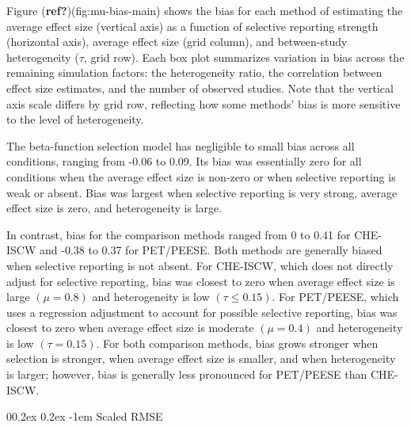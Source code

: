 \documentclass[
  american,
  man, donotrepeattitle,floatsintext]{apa7}
\makeatletter
\let\oldparagraph\paragraph
\renewcommand{\paragraph}{
    \@ifstar
      \xxxParagraphStar
      \xxxParagraphNoStar
  }
\newcommand{\xxxParagraphStar}[1]{\oldparagraph*{#1}\mbox{}}
\newcommand{\xxxParagraphNoStar}[1]{\oldparagraph{#1}\mbox{}}
\renewcommand{\paragraph}{\@startsection{paragraph}{4}{\parindent}%
  {0\baselineskip \@plus 0.2ex \@minus 0.2ex}%
  {-1em}%
  {\normalfont\normalsize\bfseries\itshape\typesectitle}}
\makeatother
\begin{document}
Figure (\textbf{ref?})(fig:mu-bias-main) shows the bias for each method of estimating the average effect size (vertical axis) as a function of selective reporting strength (horizontal axis), average effect size (grid column), and between-study heterogeneity (\(\tau\), grid row). Each box plot summarizes variation in bias across the remaining simulation factors: the heterogeneity ratio, the correlation between effect size estimates, and the number of observed studies. Note that the vertical axis scale differs by grid row, reflecting how some methods' bias is more sensitive to the level of heterogeneity.

The beta-function selection model has negligible to small bias across all conditions, ranging from -0.06 to 0.09. Its bias was essentially zero for all conditions when the average effect size is non-zero or when selective reporting is weak or absent. Bias was largest when selective reporting is very strong, average effect size is zero, and heterogeneity is large.

In contrast, bias for the comparison methods ranged from 0 to 0.41 for CHE-ISCW and -0.38 to 0.37 for PET/PEESE. Both methods are generally biased when selective reporting is not absent.
For CHE-ISCW, which does not directly adjust for selective reporting, bias was closest to zero when average effect size is large \((\mu = 0.8)\) and heterogeneity is low \((\tau \leq 0.15)\).
For PET/PEESE, which uses a regression adjustment to account for possible selective reporting, bias was closest to zero when average effect size is moderate \((\mu = 0.4)\) and heterogeneity is low \((\tau = 0.15)\).
For both comparison methods, bias grows stronger when selection is stronger, when average effect size is smaller, and when heterogeneity is larger; however, bias is generally less pronounced for PET/PEESE than CHE-ISCW.

\paragraph{Scaled RMSE}\label{scaled-rmse}
\end{document}
